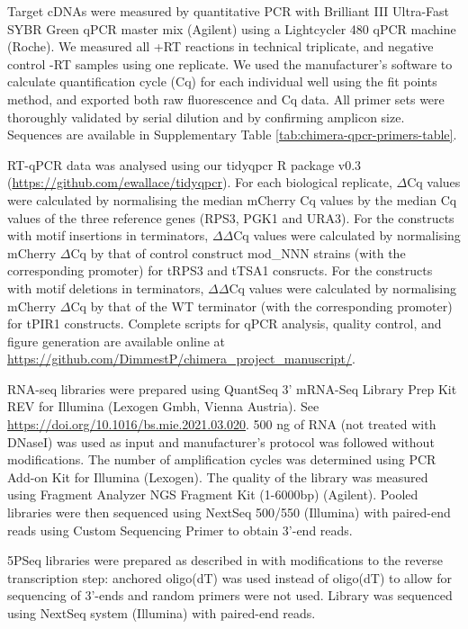 \documentclass[../main.tex]{subfiles}
\begin{document}
Target cDNAs were measured by quantitative PCR with Brilliant III Ultra-Fast SYBR Green qPCR master mix (Agilent) using a Lightcycler 480 qPCR machine (Roche).
We measured all +RT reactions in technical triplicate, and negative control -RT samples using one replicate.
We used the manufacturer's software to calculate quantification cycle (Cq) for each individual well using the fit points method, and exported both raw fluorescence and Cq data.
All primer sets were thoroughly validated by serial dilution and by confirming amplicon size. Sequences are available in Supplementary Table \ref{tab:chimera-qpcr-primers-table}.

RT-qPCR data was analysed using our tidyqpcr R package v0.3 (\url{https://github.com/ewallace/tidyqpcr}).
For each biological replicate, \(\Delta\)Cq values were calculated by normalising the median mCherry Cq values by the median Cq values of the three reference genes (RPS3, PGK1 and URA3).
For the constructs with motif insertions in terminators, \(\Delta\Delta\)Cq values were calculated by normalising mCherry \(\Delta\)Cq by that of control construct mod\_NNN strains (with the corresponding promoter) for tRPS3 and tTSA1 consructs.
For the constructs with motif deletions in terminators, \(\Delta\Delta\)Cq values were calculated by normalising mCherry \(\Delta\)Cq by that of the WT terminator (with the corresponding promoter) for tPIR1 constructs.
Complete scripts for qPCR analysis, quality control, and figure generation are available online at \url{https://github.com/DimmestP/chimera_project_manuscript/}.

RNA-seq libraries were prepared using QuantSeq 3' mRNA-Seq Library Prep Kit REV for Illumina (Lexogen Gmbh, Vienna Austria).
See \url{https://doi.org/10.1016/bs.mie.2021.03.020}.
500 ng of RNA (not treated with DNaseI) was used as input and manufacturer's protocol was followed without modifications.
The number of amplification cycles was determined using PCR Add-on Kit for Illumina (Lexogen).
The quality of the library was measured using Fragment Analyzer NGS Fragment Kit (1-6000bp) (Agilent).
Pooled libraries were then sequenced using NextSeq 500/550 (Illumina) with paired-end reads using Custom Sequencing Primer to obtain 3'-end reads.

5PSeq libraries were prepared as described in \parencite{Zhang2021} with modifications to the reverse transcription step: anchored oligo(dT) was used instead of oligo(dT) to allow for sequencing of 3'-ends and random primers were not used.
Library was sequenced using NextSeq system (Illumina) with paired-end reads.
\end{document}
